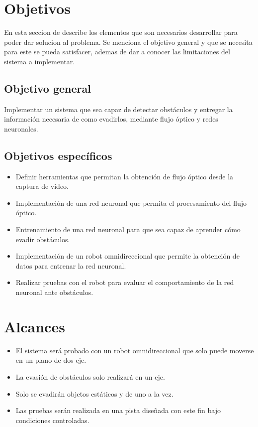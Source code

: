 \documentclass{iccmemoria}
\begin{document}
\section{Objetivos}

En esta seccion de describe los elementos que son necesarios desarrollar para poder dar solucion al problema. Se menciona el objetivo general y que se necesita para este se pueda satisfacer, ademas de dar a conocer las limitaciones del sistema a implementar.

\subsection{Objetivo general}

Implementar un sistema que sea capaz de detectar obstáculos y entregar la información necesaria de como evadirlos, mediante flujo óptico y redes neuronales.

\subsection{Objetivos específicos}
 
\begin{itemize}
    \item Definir herramientas que permitan la obtención de flujo óptico desde la captura de video.
    \item Implementación de una red neuronal que permita el procesamiento del flujo óptico.
    \item Entrenamiento de una red neuronal para que sea capaz de aprender cómo evadir obstáculos.
    \item Implementación de un robot omnidireccional que permite la obtención de datos para entrenar la red neuronal.
    \item Realizar pruebas con el robot para evaluar el comportamiento de la red neuronal ante obstáculos.
\end{itemize}
 
\section{Alcances}
 
\begin{itemize}
    \item El sistema será probado con un robot omnidireccional que solo puede moverse en un plano de dos eje.
    \item La evasión de obstáculos solo realizará en un eje.
    \item Solo se evadirán objetos estáticos y de uno a la vez.
    \item Las pruebas serán realizada en una pista diseñada con este fin bajo condiciones controladas.
\end{itemize}
\end{document}
